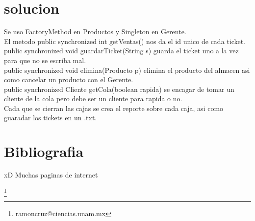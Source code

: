 \documentclass[12pt]{article}
\begin{document}
\section{solucion}
Se uso FactoryMethod en Productos y Singleton en Gerente.\\
El metodo public synchronized int getVentas() nos da el id unico de cada ticket.\\
public synchronized void guardarTicket(String s) guarda el ticket uno a la vez para que no se escriba mal. \\  public synchronized void elimina(Producto p) elimina el producto del almacen asi como cancelar un producto con el Gerente.\\ public synchronized Cliente getCola(boolean rapida) se encagar de tomar un cliente de la cola pero debe ser un cliente para rapida o no.\\
Cada que se cierran las cajas se crea el reporte sobre cada caja, asi como guaradar los tickets en un .txt.

\section{Bibliografia}
xD Muchas paginas de internet

\footnote{ramoncruz@ciencias.unam.mx}
\end{document}
